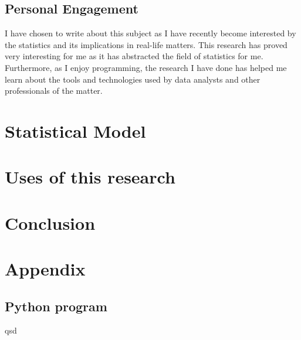 \documentclass[11pt,letterpaper]{article}
\begin{document}
\subsection{Personal Engagement}

I have chosen to write about this subject as I have recently become interested by the 
statistics and its implications in real-life matters. This research has proved very 
interesting for me as it has abstracted the field of statistics for me. Furthermore, 
as I enjoy programming, the research I have done has helped me learn about the tools 
and technologies used by data analysts and other professionals of the matter. 


\section{}


\section{Statistical Model}

\section{Uses of this research}

\section{Conclusion}
\printbibliography[heading=bibintoc, title=Works Cited]

\appendix
\section{Appendix}
\label{app}
\subsection{Python program}
\label{app:scripts}
qsd

\end{document}
